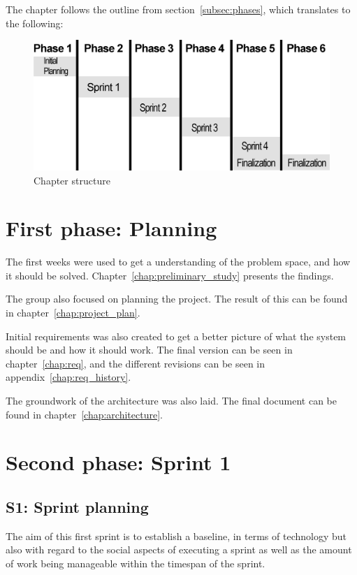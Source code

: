 \documentclass[11pt]{book}
\begin{document}
The chapter follows the outline from section~\ref{subsec:phases}, which translates to the following:
\begin{figure}[H]
    \centering
    \includegraphics[width=1.0\textwidth]{Figures/Phases/phases.png}
    \caption{Chapter structure}
    \label{fig:phases_structure}
\end{figure}

\section{First phase: Planning}
The first weeks were used to get a understanding of the problem space, and how it should be solved. Chapter~\ref{chap:preliminary_study} presents the findings.

The group also focused on planning the project. The result of this can be found in chapter~\ref{chap:project_plan}.

Initial requirements was also created to get a better picture of what the system should be and how it should work. The final version can be seen in chapter~\ref{chap:req}, and the different revisions can be seen in appendix~\ref{chap:req_history}.

The groundwork of the architecture was also laid. The final document can be found in chapter~\ref{chap:architecture}.

\section{Second phase: Sprint 1}
\subsection{S1: Sprint planning}
The aim of this first sprint is to establish a baseline, in terms of technology but also with regard to the social aspects of executing a sprint as well as the amount of work being manageable within the timespan of the sprint.
\end{document}

